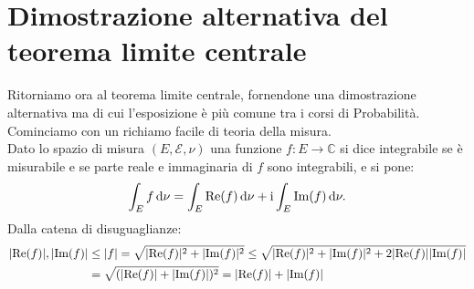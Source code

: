 \documentclass[11pt]{book}
\theoremstyle{Definizione}
\theoremstyle{TeoremaProposizioneLemmaCorollario}
\theoremstyle{OsservazioneNota}
\newcommand{\C}{\mathbb{C}}
\renewcommand{\Re}{\textup{Re}}
\renewcommand{\Im}{\textup{Im}}
\renewcommand{\d}{\mathrm{d}}
\begin{document}
\section{Dimostrazione alternativa del teorema limite centrale}
Ritorniamo ora al teorema limite centrale, fornendone una dimostrazione alternativa ma di cui l'esposizione è più comune tra i corsi di Probabilità. Cominciamo con un richiamo facile di teoria della misura.\\
Dato lo spazio di misura $(E,\mathcal{E},\nu)$ una funzione $f:E\longrightarrow \C$ si dice integrabile se è misurabile e se parte reale e immaginaria di $f$ sono integrabili, e si pone:
$$
\int_E f\, \d \nu =  \int_E \textup{Re}(f)\,\d \nu + \textup{i} \int_E \textup{Im}(f)\,\d\nu.
$$
Dalla catena di disuguaglianze:
\begin{align*}
|\textup{Re}(f)|,|\textup{Im}(f)| &\leq |f| = \sqrt{|\textup{Re}(f)|^2+|\textup{Im}(f)|^2}\leq \sqrt{|\textup{Re}(f)|^2+|\textup{Im}(f)|^2+2|\textup{Re}(f)||\textup{Im}(f)|} \\
&= \sqrt{(|\textup{Re}(f)|+|\textup{Im}(f)|)^2} = |\Re(f)|+|\Im(f)|
\end{align*}
\end{document}
